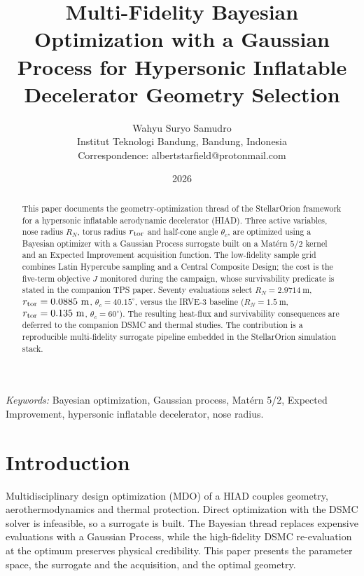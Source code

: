 \documentclass[10pt]{article}
\begin{document}
\title{Multi-Fidelity Bayesian Optimization with a Gaussian Process for Hypersonic Inflatable Decelerator Geometry Selection}
\author{Wahyu Suryo Samudro\\
Institut Teknologi Bandung, Bandung, Indonesia\\
Correspondence: albertstarfield@protonmail.com}
\date{2026}
\maketitle

\begin{abstract}
This paper documents the geometry-optimization thread of the StellarOrion framework for a hypersonic inflatable aerodynamic decelerator (HIAD). Three active variables, nose radius $R_N$, torus radius $r_{\rm tor}$ and half-cone angle $\theta_c$, are optimized using a Bayesian optimizer with a Gaussian Process surrogate built on a Mat\'ern $5/2$ kernel and an Expected Improvement acquisition function. The low-fidelity sample grid combines Latin Hypercube sampling and a Central Composite Design; the cost is the five-term objective $J$ monitored during the campaign, whose survivability predicate is stated in the companion TPS paper. Seventy evaluations select $R_N = 2.9714~\mathrm{m}$, $r_{\rm tor}=0.0885~\mathrm{m}$, $\theta_c=40.15^{\circ}$, versus the IRVE-3 baseline ($R_N=1.5~\mathrm{m}$, $r_{\rm tor}=0.135~\mathrm{m}$, $\theta_c=60^{\circ}$). The resulting heat-flux and survivability consequences are deferred to the companion DSMC and thermal studies. The contribution is a reproducible multi-fidelity surrogate pipeline embedded in the StellarOrion simulation stack.
\end{abstract}

\noindent\textit{Keywords:} Bayesian optimization, Gaussian process, Mat\'ern 5/2, Expected Improvement, hypersonic inflatable decelerator, nose radius.\par\vspace{0.8em}

\section{Introduction}
Multidisciplinary design optimization (MDO) of a HIAD couples geometry, aerothermodynamics and thermal protection. Direct optimization with the DSMC solver is infeasible, so a surrogate is built. The Bayesian thread replaces expensive evaluations with a Gaussian Process, while the high-fidelity DSMC re-evaluation at the optimum preserves physical credibility. This paper presents the parameter space, the surrogate and the acquisition, and the optimal geometry.
\end{document}
